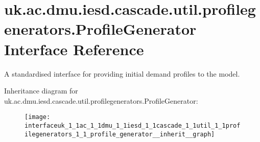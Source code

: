 \hypertarget{interfaceuk_1_1ac_1_1dmu_1_1iesd_1_1cascade_1_1util_1_1profilegenerators_1_1_profile_generator}{\section{uk.\-ac.\-dmu.\-iesd.\-cascade.\-util.\-profilegenerators.\-Profile\-Generator Interface Reference}
\label{interfaceuk_1_1ac_1_1dmu_1_1iesd_1_1cascade_1_1util_1_1profilegenerators_1_1_profile_generator}
}


A standardised interface for providing initial demand profiles to the model.  




Inheritance diagram for uk.\-ac.\-dmu.\-iesd.\-cascade.\-util.\-profilegenerators.\-Profile\-Generator\-:\nopagebreak
\begin{figure}[H]
\begin{center}
\leavevmode
\texttt{[image: interfaceuk\_1\_1ac\_1\_1dmu\_1\_1iesd\_1\_1cascade\_1\_1util\_1\_1profilegenerators\_1\_1\_profile\_generator\_\_inherit\_\_graph]}
\end{center}
\end{figure}
